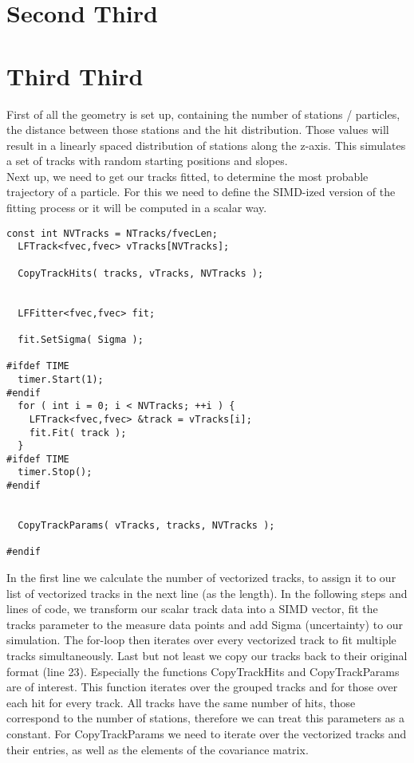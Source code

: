 \documentclass{article}
\begin{document}
\section*{Second Third}


\section*{Third Third}
First of all the geometry is set up, containing the number of stations / particles, the distance between those stations and the hit distribution.
Those values will result in a linearly spaced distribution of stations along the z-axis.
This simulates a set of tracks with random starting positions and slopes. \\

\noindent Next up, we need to get our tracks fitted, to determine the most probable
trajectory of a particle. For this we need to define the SIMD-ized version of the fitting process or
it will be computed in a scalar way.



\begin{lstlisting}[caption=KFLineFitter.cpp]
  const int NVTracks = NTracks/fvecLen;
  LFTrack<fvec,fvec> vTracks[NVTracks];
  
  CopyTrackHits( tracks, vTracks, NVTracks );
  
    
  LFFitter<fvec,fvec> fit;

  fit.SetSigma( Sigma );
  
#ifdef TIME
  timer.Start(1);
#endif
  for ( int i = 0; i < NVTracks; ++i ) {
    LFTrack<fvec,fvec> &track = vTracks[i];
    fit.Fit( track );
  }
#ifdef TIME
  timer.Stop();
#endif
  
    
  CopyTrackParams( vTracks, tracks, NVTracks );
  
#endif
\end{lstlisting}

\noindent In the first line we calculate the number of vectorized tracks, to assign it to our
list of vectorized tracks in the next line (as the length). In the following steps and lines of code,
we transform our scalar track data into a SIMD vector, fit the tracks parameter to the measure data points
and add Sigma (uncertainty) to our simulation.
The for-loop then iterates over every vectorized track to fit multiple tracks simultaneously.
Last but not least we copy our tracks back to their original format (line 23).
Especially the functions CopyTrackHits and CopyTrackParams are of interest.
This function iterates over the grouped tracks and for those over each hit for every track.
All tracks have the same number of hits, those correspond to the number of stations, therefore
we can treat this parameters as a constant.
For CopyTrackParams we need to iterate over the vectorized tracks and their entries, as well as the
elements of the covariance matrix. \\
\end{document}
